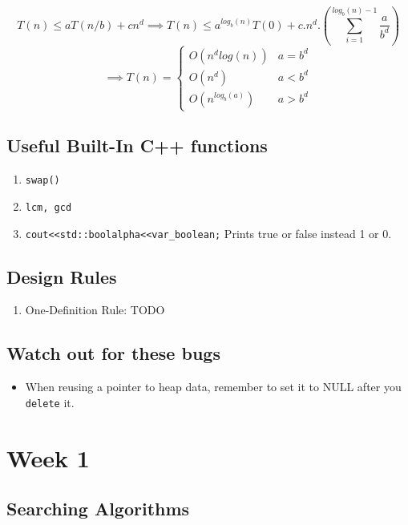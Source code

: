\documentclass{report}
\begin{document}
\begin{equation}
T(n) \le aT(n/b) + cn^d \implies
T(n) \le a^{log_b(n)}T(0) + c.n^d.(\sum_{i=1}^{log_b(n)-1}{\frac{a}{b^d}})
\end{equation}
\begin{equation}
\implies T(n) = 
\begin{cases}
O(n^dlog(n)) & a = b^d \\
O(n^d) & a < b^d \\
O(n^{log_b(a)}) & a > b^d 
\end{cases}    
\end{equation}

\section{Useful Built-In C++ functions}
\begin{enumerate}
\item \texttt{swap()}
\item \texttt{lcm, gcd}
\item \texttt{cout<<std::boolalpha<<var\_boolean;} Prints true or false instead 1 or 0.
\end{enumerate}
\section{Design Rules}
\begin{enumerate}
\item One-Definition Rule: TODO
\end{enumerate}
\section{Watch out for these bugs}
\begin{itemize}
\item When reusing a pointer to heap data, remember to set it to NULL after you \texttt{delete} it.
\end{itemize}
\chapter{Week 1}
\section{Searching Algorithms}
\end{document}
